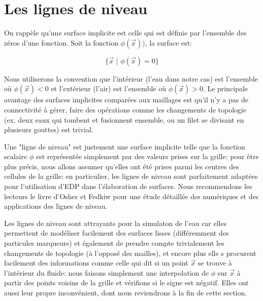 \documentclass[11pt]{report}
\begin{document}
\section{Les lignes de niveau}

On rappèle qu'une surface implicite est celle qui est définie par l'ensemble des zéros d'une fonction. Soit la fonction $\phi(\overrightarrow{x}))$, la surface est:

\begin{equation}
\{\overrightarrow{x} \,\, | \,\, \phi(\overrightarrow{x}) = 0\}
\end{equation}

Nous utiliserons la convention que l'intérieur (l'eau dans notre cas) est l'ensemble où $\phi(\overrightarrow{x}) < 0$ et l'extérieur (l'air) est l'ensemble où $\phi(\overrightarrow{x}) > 0$. Le principale avantage des surfaces implicites comparées aux maillages est qu'il n'y a pas de connectivité à gérer, faire des opérations comme les changements de topologie (ex. deux eaux qui tombent et fusionnent ensemble, ou un filet se divisant en plusieurs gouttes) est trivial.\newline

Une "ligne de niveau" est justement une surface implicite telle que la fonction scalaire $\phi$ est représentée simplement par des valeurs prises sur la grille: pour être plus précis, nous allons assumer qu'elles ont été prises parmi les centres des cellules de la grille: en particulier, les lignes de niveau sont parfaitement adaptées pour l'utilisation d'EDP dans l'élaboration de surfaces. Nous recommendons les lecteurs le livre d'Osher et Fedkiw \cite{osher-fedkiw-2002} pour une étude détaillée des numériques et des applications des lignes de niveau.\newline

Les lignes de niveau sont attrayants pour la simulaton de l'eau car elles permettent de modéliser facilement des surfaces lisses (différemment des particules marqueurs) et également de prendre compte trivialement les changements de topologie (à l'opposé des mailles), et encore plus elle s procurent facilement des informations comme celle qui dit si un point $\overrightarrow{x}$ se trouve à l'intérieur du fluide: nous faisons simplement une interpolation de $\phi$ sur $\overrightarrow{x}$ à partir des points voisins de la grille et vérifions si le signe est négatif. Elles ont aussi leur propre inconvénient, dont nous reviendrons à la fin de cette section.\newline
\end{document}

